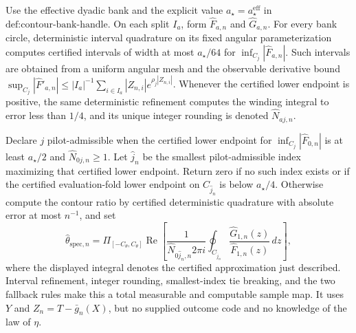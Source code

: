 Use the effective dyadic bank and the explicit value \(a_{\star}=a_{\star}^{\mathrm{eff}}\) in \(\text{def:contour-bank-handle}\).  On each split \(I_a\), form \(\widehat F_{a,n}\) and \(\widehat G_{a,n}\).  For every bank circle, deterministic interval quadrature on its fixed angular parameterization computes certified intervals of width at most \(a_{\star}/64\) for \(\inf_{C_j}|\widehat F_{a,n}|\).  Such intervals are obtained from a uniform angular mesh and the observable derivative bound \(\sup_{C_j}|\widehat F'_{a,n}|\le |I_a|^{-1}\sum_{i\in I_a}|Z_{n,i}|e^{\rho_j|Z_{n,i}|}\).  Whenever the certified lower endpoint is positive, the same deterministic refinement computes the winding integral to error less than \(1/4\), and its unique integer rounding is denoted \(\widehat N_{aj,n}\).

Declare \(j\) pilot-admissible when the certified lower endpoint for \(\inf_{C_j}|\widehat F_{0,n}|\) is at least \(a_{\star}/2\) and \(\widehat N_{0j,n}\ge1\).  Let \(\widehat j_n\) be the smallest pilot-admissible index maximizing that certified lower endpoint.  Return zero if no such index exists or if the certified evaluation-fold lower endpoint on \(C_{\widehat j_n}\) is below \(a_{\star}/4\).  Otherwise compute the contour ratio by certified deterministic quadrature with absolute error at most \(n^{-1}\), and set
\[
 \widehat\theta_{\mathrm{spec},n}
 =\Pi_{[-C_{\theta},C_{\theta}]}
 \operatorname{Re}\!\left[
 \frac{1}{\widehat N_{0\widehat j_n,n}2\pi i}
 \oint_{C_{\widehat j_n}}
 \frac{\widehat G_{1,n}(z)}{\widehat F_{1,n}(z)}\,dz
 \right],
\]
where the displayed integral denotes the certified approximation just described.  Interval refinement, integer rounding, smallest-index tie breaking, and the two fallback rules make this a total measurable and computable sample map.  It uses \(Y\) and \(Z_n=T-\bar g_n(X)\), but no supplied outcome code and no knowledge of the law of \(\eta\).